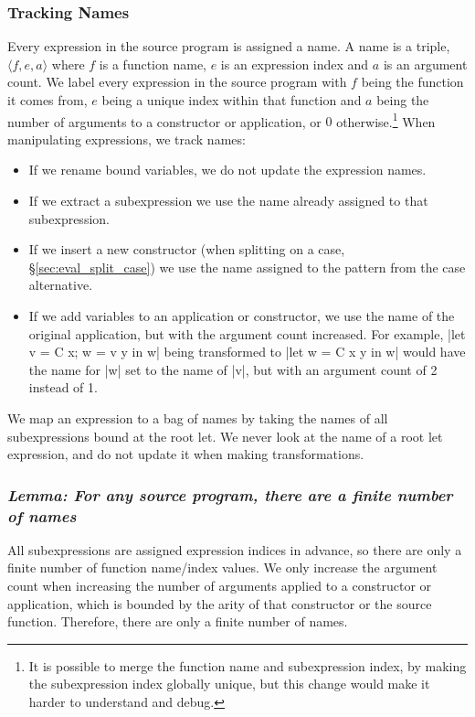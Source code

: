 \documentclass[draft]{sigplanconf}
\newcommand{\name}[3]{\ensuremath{\langle\mathsf{#1},\mathsf{#2},\mathsf{#3}\rangle}}
\newcommand{\lemma}[1]{\subsubsection*{\textit{Lemma: #1}}}
\begin{document}
\subsubsection{Tracking Names}

Every expression in the source program is assigned a name. A name is a triple, \name{\mathit{f}}{\mathit{e}}{\mathit{a}} where $f$ is a function name, $e$ is an expression index and $a$ is an argument count. We label every expression in the source program with $f$ being the function it comes from, $e$ being a unique index within that function and $a$ being the number of arguments to a constructor or application, or $0$ otherwise.\footnote{It is possible to merge the function name and subexpression index, by making the subexpression index globally unique, but this change would make it harder to understand and debug.} When manipulating expressions, we track names:

\begin{itemize}
\item If we rename bound variables, we do not update the expression names.
\item If we extract a subexpression we use the name already assigned to that subexpression.
\item If we insert a new constructor (when splitting on a case, \S\ref{sec:eval_split_case}) we use the name assigned to the pattern from the case alternative.
\item If we add variables to an application or constructor, we use the name of the original application, but with the argument count increased. For example, |let v = C x; w = v y in w| being transformed to |let w = C x y in w| would have the name for |w| set to the name of |v|, but with an argument count of 2 instead of 1.
\end{itemize}

We map an expression to a bag of names by taking the names of all subexpressions bound at the root let. We never look at the name of a root let expression, and do not update it when making transformations.

\lemma{For any source program, there are a finite number of names}

All subexpressions are assigned expression indices in advance, so there are only a finite number of function name/index values. We only increase the argument count when increasing the number of arguments applied to a constructor or application, which is bounded by the arity of that constructor or the source function. Therefore, there are only a finite number of names.
\end{document}
